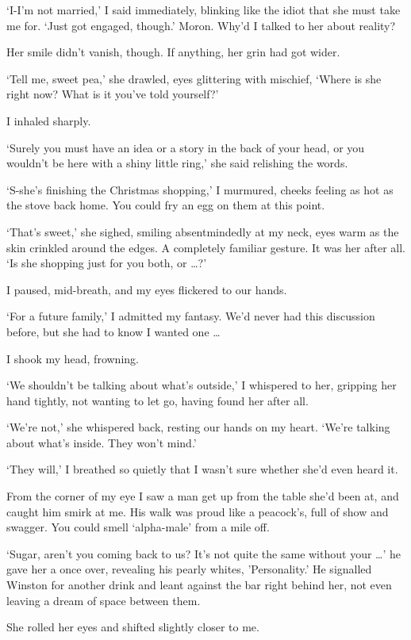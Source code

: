 `I-I'm not married,' I said immediately, blinking like the idiot that
she must take me for. `Just got engaged, though.' Moron. Why'd I
talked to her about reality?

Her smile didn't vanish, though. If anything, her grin had got wider.

`Tell me, sweet pea,' she drawled, eyes glittering with mischief,
`Where is she right now? What is it you've told yourself?'

I inhaled sharply.

`Surely you must have an idea or a story in the back of your head, or
you wouldn't be here with a shiny little ring,' she said relishing the
words.

`S-she's finishing the Christmas shopping,' I murmured, cheeks feeling
as hot as the stove back home. You could fry an egg on them at this
point.

`That's sweet,' she sighed, smiling absentmindedly at my neck, eyes
warm as the skin crinkled around the edges. A completely familiar
gesture. It was her after all. `Is she shopping just for you both, or
\ldots ?'

I paused, mid-breath, and my eyes flickered to our hands.

`For a future family,' I admitted my fantasy. We'd never had this
discussion before, but she had to know I wanted one \ldots

I shook my head, frowning.

`We shouldn't be talking about what's outside,' I whispered to her,
gripping her hand tightly, not wanting to let go, having found her
after all.

`We're not,' she whispered back, resting our hands on my heart. `We're
talking about what's inside. They won't mind.'

`They will,' I breathed so quietly that I wasn't sure whether she'd
even heard it.

From the corner of my eye I saw a man get up from the table she'd been
at, and caught him smirk at me. His walk was proud like a peacock's,
full of show and swagger. You could smell ‘alpha-male' from a mile
off.

`Sugar, aren't you coming back to us? It's not quite the same without
your \ldots ' he gave her a once over, revealing his pearly whites,
'Personality.' He signalled Winston for another drink and leant
against the bar right behind her, not even leaving a dream of space
between them.

She rolled her eyes and shifted slightly closer to me.

